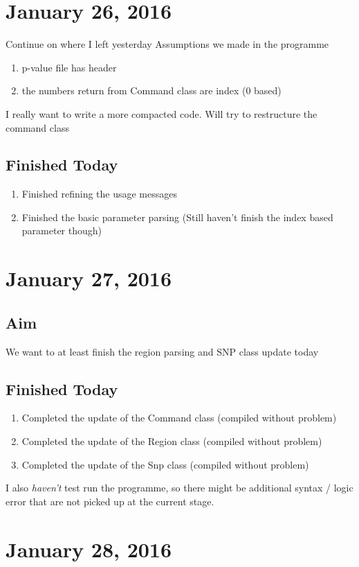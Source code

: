 \documentclass[12pt]{article}
\begin{document}
	\section{January 26, 2016}
	Continue on where I left yesterday
	Assumptions we made in the programme
	\begin{enumerate}
		\item p-value file has header
		\item the numbers return from Command class are index (0 based)
	\end{enumerate}
	I really want to write a more compacted code.
	Will try to restructure the command class
	\subsection{Finished Today}
	\begin{enumerate}
		\item Finished refining the usage messages
		\item Finished the basic parameter parsing (Still haven't finish the index based parameter though)
	\end{enumerate}
	\section{January 27, 2016}
	\subsection{Aim}
	We want to at least finish the region parsing and SNP class update today
	\subsection{Finished Today}
	\begin{enumerate}
		\item Completed the update of the Command class (compiled without problem)
		\item Completed the update of the Region class (compiled without problem)
		\item Completed the update of the Snp class (compiled without problem)
	\end{enumerate}
	I also \emph{haven't} test run the programme, so there might be additional syntax / logic error that are not picked up at the current stage.
	
	\section{January 28, 2016}
\end{document}
